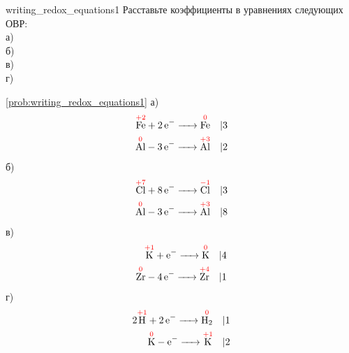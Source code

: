 \begin{problem}{}{writing_redox_equations1}
    Расставьте коэффициенты в уравнениях следующих ОВР: \\
    а)  \\
    б)  \\
    в)  \\
    г) 
    \begin{sol}{\ref{prob:writing_redox_equations1}}
        а) 
        \begin{align*}
            \overset{\textcolor{red}{+2}}{\ce{Fe}} + \ce{2e- ->} \overset{\textcolor{red}{0}}{\ce{Fe}} \quad &| 3 \\
            \overset{\textcolor{red}{0}}{\ce{Al}} - \ce{3e- ->} \overset{\textcolor{red}{+3}}{\ce{Al}} \quad &| 2
        \end{align*}
        б) 
        \begin{align*}
            \overset{\textcolor{red}{+7}}{\ce{Cl}} + \ce{8e- ->} \overset{\textcolor{red}{-1}}{\ce{Cl}} \quad &| 3 \\
            \overset{\textcolor{red}{0}}{\ce{Al}} - \ce{3e- ->} \overset{\textcolor{red}{+3}}{\ce{Al}} \quad &| 8
        \end{align*}
        в) 
        \begin{align*}
            \overset{\textcolor{red}{+1}}{\ce{K}} + \ce{e- ->} \overset{\textcolor{red}{0}}{\ce{K}} \quad &| 4 \\
            \overset{\textcolor{red}{0}}{\ce{Zr}} - \ce{4e- ->} \overset{\textcolor{red}{+4}}{\ce{Zr}} \quad &| 1
        \end{align*}
        г) 
        \begin{align*}
            2\overset{\textcolor{red}{+1}}{\ce{H}} + \ce{2e- ->} \overset{\textcolor{red}{0}}{\ce{H2}} \quad &| 1 \\
            \overset{\textcolor{red}{0}}{\ce{K}} - \ce{e- ->} \overset{\textcolor{red}{+1}}{\ce{K}} \quad &| 2
        \end{align*}
    \end{sol}
\end{problem}

